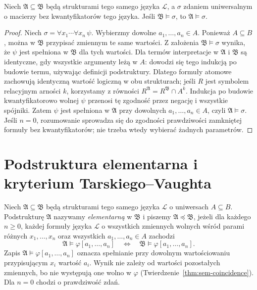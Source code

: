 \begin{twierdzenie}\label{thm:model-universal-substructure}
Niech $\mathfrak A\subseteq\mathfrak B$ będą strukturami
tego samego języka $\mathcal L$, a $\sigma$ zdaniem
uniwersalnym o macierzy bez kwantyfikatorów tego języka.
Jeśli $\mathfrak B\models\sigma$, to $\mathfrak A\models\sigma$.
\end{twierdzenie}
\begin{proof}
Niech $\sigma=\forall x_1\cdots\forall x_n\,\psi$.
Wybierzmy dowolne $a_1,\ldots,a_n\in A$.
Ponieważ $A\subseteq B$, można w $\mathfrak B$
przypisać zmiennym te same wartości. Z założenia
$\mathfrak B\models\sigma$ wynika, że
$\psi$ jest spełniona w $\mathfrak B$ dla tych wartości.
Dla termów interpretacje w $\mathfrak A$ i $\mathfrak B$
są identyczne, gdy wszystkie argumenty leżą w $A$:
dowodzi się tego indukcją po budowie termu, używając
definicji podstruktury. Dlatego formuły atomowe
zachowują identyczną wartość logiczną w obu strukturach;
jeśli $R$ jest symbolem relacyjnym arności $k$,
korzystamy z równości
$R^{\mathfrak A}=R^{\mathfrak B}\cap A^k$.
Indukcja po budowie kwantyfikatorowo wolnej $\psi$
przenosi tę zgodność przez negację i wszystkie spójniki.
Zatem $\psi$ jest spełniona w $\mathfrak A$
przy dowolnych $a_1,\ldots,a_n\in A$,
czyli $\mathfrak A\models\sigma$.
Jeśli $n=0$, rozumowanie sprowadza się do zgodności
prawdziwości zamkniętej formuły bez kwantyfikatorów;
nie trzeba wtedy wybierać żadnych parametrów.
\end{proof}

\section{Podstruktura elementarna i kryterium Tarskiego--Vaughta}
\begin{definicja}\label{def:model-elementary-substructure}
Niech $\mathfrak A\subseteq\mathfrak B$ będą strukturami
tego samego języka $\mathcal L$ o uniwersach $A\subseteq B$.
Podstrukturę $\mathfrak A$ nazywamy \emph{elementarną}
w $\mathfrak B$ i piszemy $\mathfrak A\preccurlyeq\mathfrak B$,
jeżeli dla każdego $n\ge0$, każdej formuły języka $\mathcal L$
o wszystkich zmiennych wolnych wśród parami różnych
$x_1,\ldots,x_n$ oraz wszystkich $a_1,\ldots,a_n\in A$
zachodzi
\[
\mathfrak A\models\varphi[a_1,\ldots,a_n]
\quad\Longleftrightarrow\quad
\mathfrak B\models\varphi[a_1,\ldots,a_n].
\]
Zapis $\mathfrak A\models\varphi[a_1,\ldots,a_n]$
oznacza spełnianie przy dowolnym wartościowaniu przypisującym
$x_i$ wartość $a_i$. Wynik nie zależy od wartości pozostałych
zmiennych, bo nie występują one wolno w $\varphi$
(Twierdzenie~\ref{thm:sem-coincidence}).
Dla $n=0$ chodzi o prawdziwość zdań.
\end{definicja}

